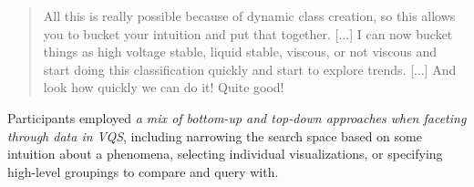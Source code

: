 \begin{quote}
All this is really possible because of dynamic class creation, so this allows you to bucket your intuition and put that together. [...] I can now bucket things as high voltage stable, liquid stable, viscous, or not viscous and start doing this classification quickly and start to explore trends. [...] And look how quickly we can do it! Quite good!
\end{quote}
\par Participants employed \emph{a mix of bottom-up and top-down approaches when faceting through data in VQS}, including narrowing the search space based on some intuition about a phenomena, selecting individual visualizations, or specifying high-level groupings to compare and query with.
